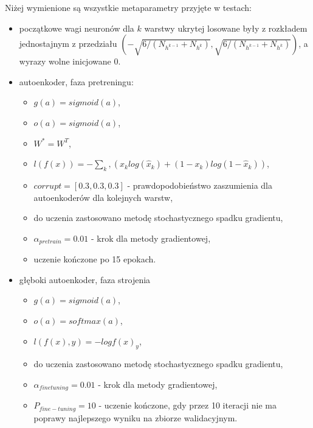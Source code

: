 \documentclass[fleqn]{scrartcl}
\begin{document}
Niżej wymienione są wszystkie metaparametry przyjęte w testach:
\begin{itemize}
    
    \item początkowe wagi neuronów dla $k$ warstwy ukrytej losowane były z rozkładem jednostajnym z przedziału 
        $(-\sqrt{6 / (N_{h^{k-1}} + N_{h^{k}})}, \sqrt{6 / (N_{h^{k-1}} + N_{h^{k}})})$, 
        a wyrazy wolne inicjowane $0$.
    
    \item autoenkoder, faza pretreningu:
        \begin{itemize}
            \item $g(a) = sigmoid(a)$,  
            \item $o(a) = sigmoid(a)$,
            \item $W^{*} = W^{T}$,
            \item $l(f(x))=-\sum_{k}, 
                (x_{k}log(\hat{x}_{k})+(1-x_{k})log(1-\hat{x}_{k}))$,
            \item $corrupt = [0.3,0.3,0.3]$ - prawdopodobieństwo 
                zaszumienia dla autoenkoderów dla kolejnych warstw,
            \item do uczenia zastosowano metodę stochastycznego spadku gradientu,
            \item $\alpha_{pretrain} = 0.01$ - 
                krok dla metody gradientowej,
            \item uczenie kończone po 15 epokach.
            
        \end{itemize}
    \item głęboki autoenkoder, faza strojenia
        \begin{itemize}
            \item $g(a) = sigmoid(a)$, 
            \item $o(a) = softmax(a)$,
            \item $l(f(x), y)= -log f(x)_{y}$,
            \item do uczenia zastosowano metodę stochastycznego spadku gradientu,  
            \item $\alpha_{finetuning} = 0.01$ - krok dla 
                metody gradientowej,  
            \item $P_{fine-tuning} = 10$ - uczenie kończone, 
                gdy przez 10 iteracji nie ma poprawy najlepszego 
                wyniku na zbiorze walidacyjnym.
            
        \end{itemize}
\end{itemize}
\end{document}
